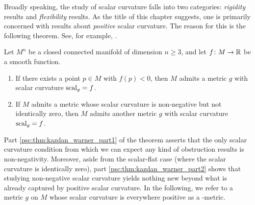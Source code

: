 Broadly speaking, the study of scalar curvature falls into two categories: \textit{rigidity} results and \textit{flexibility} results. As the title of this chapter suggests, one is primarily concerned with results about \textit{positive} scalar curvature. The reason for this is the following theorem. See, for example, \cite[Thm. 2.2]{stolz2014metrics}.

\begin{theorem}
    \label{psc:kazdan_warner}
    Let $M^n$ be a closed connected manifold of dimension $n \geq 3$, and let $f \colon M \to \mathbb{R}$ be a smooth function.
    \begin{enumerate}[label=(\roman*)]
        \item \label{psc:thm:kazdan_warner_part1} If there exists a point $p \in M$ with $f(p) < 0$, then $M$ admits a metric $g$ with scalar curvature $\mathrm{scal}_g = f$.
        \item \label{psc:thm:kazdan_warner_part2} If $M$ admits a metric whose scalar curvature is non-negative but not identically zero, then $M$ admits another metric $g$ with scalar curvature $\mathrm{scal}_g = f$.
    \end{enumerate}
\end{theorem}

Part \ref{psc:thm:kazdan_warner_part1} of the theorem asserts that the only scalar curvature condition from which we can expect any kind of obstruction results is non-negativity. Moreover, aside from the scalar-flat case (where the scalar curvature is identically zero), part \ref{psc:thm:kazdan_warner_part2} shows that studying non-negative scalar curvature yields nothing new beyond what is already captured by positive scalar curvature. In the following, we refer to a metric $g$ on $M$ whose scalar curvature is everywhere positive as a \psc-metric.

